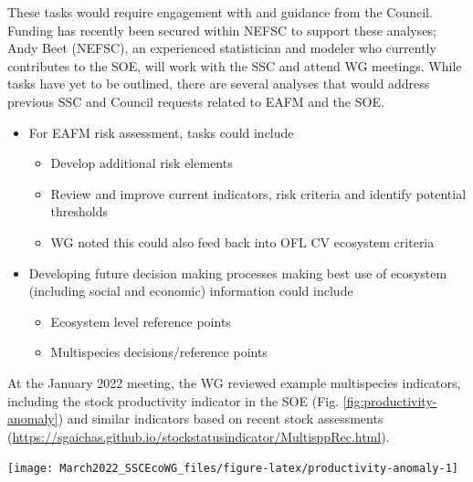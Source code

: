 \documentclass[
  10pt,
]{article}
\providecommand{\tightlist}{%
  \setlength{\itemsep}{0pt}\setlength{\parskip}{0pt}}
\let\origfigure\figure
\let\endorigfigure\endfigure
\renewenvironment{figure}[1][2] {
    \expandafter\origfigure\expandafter[H]
} {
    \endorigfigure
}
\begin{document}
These tasks would require engagement with and guidance from the Council.
Funding has recently been secured within NEFSC to support these
analyses; Andy Beet (NEFSC), an experienced statistician and modeler who
currently contributes to the SOE, will work with the SSC and attend WG
meetings. While tasks have yet to be outlined, there are several
analyses that would address previous SSC and Council requests related to
EAFM and the SOE.

\begin{itemize}
\tightlist
\item
  For EAFM risk assessment, tasks could include

  \begin{itemize}
  \tightlist
  \item
    Develop additional risk elements
  \item
    Review and improve current indicators, risk criteria and identify
    potential thresholds
  \item
    WG noted this could also feed back into OFL CV ecosystem criteria
  \end{itemize}
\item
  Developing future decision making processes making best use of
  ecosystem (including social and economic) information could include

  \begin{itemize}
  \tightlist
  \item
    Ecosystem level reference points
  \item
    Multispecies decisions/reference points
  \end{itemize}
\end{itemize}

At the January 2022 meeting, the WG reviewed example multispecies
indicators, including the stock productivity indicator in the SOE (Fig.
\ref{fig:productivity-anomaly}) and similar indicators based on recent
stock assessments
(\url{https://sgaichas.github.io/stockstatusindicator/MultisppRec.html}).

\begin{figure}

{\centering \texttt{[image: March2022\_SSCEcoWG\_files/figure-latex/productivity-anomaly-1]} 

}

\caption{Small fish per large fish biomass anomaly in the Mid-Atlantic Bight. The summed anomaly across species is shown by the black line.}\label{fig:productivity-anomaly}
\end{figure}
\end{document}
